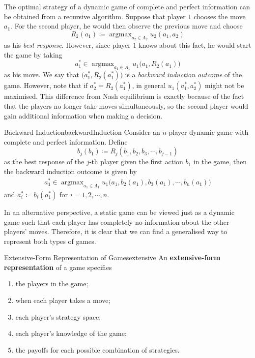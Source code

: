 \documentclass[math]{amznotes}
\theoremstyle{remark}
\DeclareMathOperator*{\argmax}{argmax}
\begin{document}
The optimal strategy of a dynamic game of complete and perfect information can be obtained from a recursive algorithm. Suppose that player $1$ chooses the move $a_1$. For the second player, he would then observe the previous move and choose 
\begin{equation*}
    R_2\left(a_1\right) \coloneqq \argmax_{a_2 \in A_2} u_2\left(a_1, a_2\right)
\end{equation*}
as his \textit{best response}. However, since player $1$ knows about this fact, he would start the game by taking 
\begin{equation*}
    a_1^* \in \argmax_{a_1 \in A_1}u_1\bigl(a_1, R_2\left(a_1\right)\bigr)
\end{equation*}
as his move. We say that $\bigl(a_1^*, R_2\left(a_1^*\right)\bigr)$ is a \textit{backward induction outcome} of the game. However, note that if $a_2^* = R_2\left(a_1^*\right)$, in general $u_1\left(a_1^*, a_2^*\right)$ might not be maximised. This difference from Nash equilibrium is exactly because of the fact that the players no longer take moves simultaneously, so the second player would gain additional information when making a decision.
\begin{thmbox}{Backward Induction}{backwardInduction}
    Consider an $n$-player dynamic game with complete and perfect information. Define 
    \begin{equation*}
        b_j\left(b_1\right) \coloneqq R_j\left(b_1, b_2, b_3, \cdots, b_{j - 1}\right)
    \end{equation*}
    as the best response of the $j$-th player given the first action $b_1$ in the game, then the backward induction outcome is given by 
    \begin{align*}
        a_1^* \in \argmax_{a_1 \in A_1} u_1\bigl(a_1, b_2\left(a_1\right), b_3\left(a_1\right), \cdots, b_n\left(a_1\right)\bigr)
    \end{align*}
    and $a_i^* \coloneqq b_i\left(a_1^*\right)$ for $i = 1, 2, \cdots, n$.
\end{thmbox}
In an alternative perspective, a static game can be viewed just as a dynamic game such that each player has completely no information about the other players' moves. Therefore, it is clear that we can find a generalised way to represent both types of games.
\begin{dfnbox}{Extensive-Form Representation of Games}{extensive}
    An {\color{red} \textbf{extensive-form representation}} of a game specifies
    \begin{enumerate}
        \item the players in the game;
        \item when each player takes a move;
        \item each player's strategy space;
        \item each player's knowledge of the game;
        \item the payoffs for each possible combination of strategies.
    \end{enumerate}
\end{dfnbox}
\end{document}
